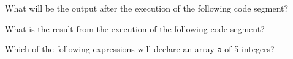 \documentclass[11pt]{examdesign}
\begin{document}
\begin{multiplechoice}[title={},suppressprefix=yes,rearrange=no]
  
\begin{question}
What will be the output after the execution of the following code segment?
\end{question}
  
\begin{question}
What is the result from the execution of the following code segment?
\end{question}
  
\begin{question}
Which of the following expressions will declare an array \texttt{a} of 5
integers?
\end{question}
  
\end{multiplechoice}
\end{document}
